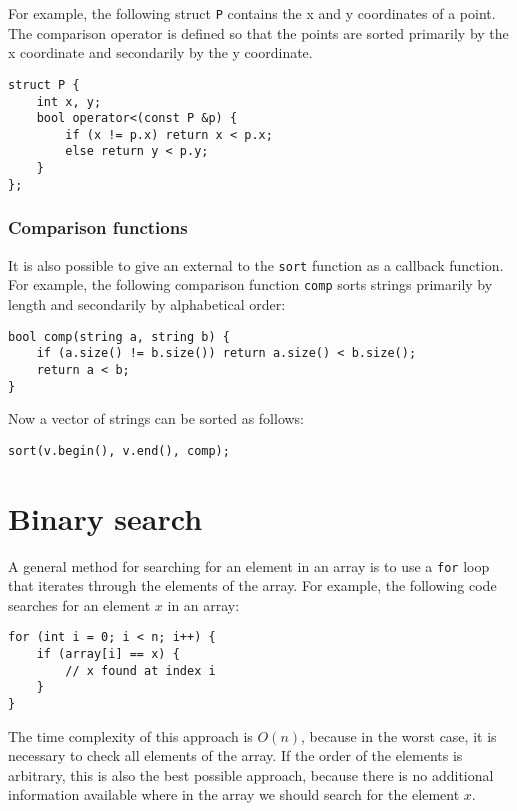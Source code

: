 For example, the following struct \texttt{P}
contains the x and y coordinates of a point.
The comparison operator is defined so that
the points are sorted primarily by the x coordinate
and secondarily by the y coordinate.

\begin{lstlisting}
struct P {
    int x, y;
    bool operator<(const P &p) {
        if (x != p.x) return x < p.x;
        else return y < p.y;
    }
};
\end{lstlisting}

\subsubsection{Comparison functions}


It is also possible to give an external
 to the \texttt{sort} function
as a callback function.
For example, the following comparison function \texttt{comp}
sorts strings primarily by length and secondarily
by alphabetical order:

\begin{lstlisting}
bool comp(string a, string b) {
    if (a.size() != b.size()) return a.size() < b.size();
    return a < b;
}
\end{lstlisting}
Now a vector of strings can be sorted as follows:
\begin{lstlisting}
sort(v.begin(), v.end(), comp);
\end{lstlisting}

\section{Binary search}


A general method for searching for an element
in an array is to use a \texttt{for} loop
that iterates through the elements of the array.
For example, the following code searches for
an element $x$ in an array:

\begin{lstlisting}
for (int i = 0; i < n; i++) {
    if (array[i] == x) {
        // x found at index i
    }
}
\end{lstlisting}

The time complexity of this approach is $O(n)$,
because in the worst case, it is necessary to check
all elements of the array.
If the order of the elements is arbitrary,
this is also the best possible approach, because
there is no additional information available where
in the array we should search for the element $x$.

